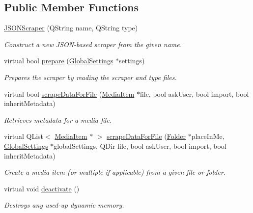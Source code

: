 \subsection*{Public Member Functions}
\begin{DoxyCompactItemize}
\item 
\hyperlink{class_a_w_e_1_1_j_s_o_n_scraper_ac6fe5d6f084e3b9ff5fdd1e5cd883351}{J\-S\-O\-N\-Scraper} (Q\-String name, Q\-String type)
\begin{DoxyCompactList}\small\item\em Construct a new J\-S\-O\-N-\/based scraper from the given name. \end{DoxyCompactList}\item 
virtual bool \hyperlink{class_a_w_e_1_1_j_s_o_n_scraper_a1b12fde072ef979911fcca4191c3c2a7}{prepare} (\hyperlink{class_a_w_e_1_1_global_settings}{Global\-Settings} $\ast$settings)
\begin{DoxyCompactList}\small\item\em Prepares the scraper by reading the scraper and type files. \end{DoxyCompactList}\item 
virtual bool \hyperlink{class_a_w_e_1_1_j_s_o_n_scraper_a883ec1b6814b4f192a28f32c8f47dd39}{scrape\-Data\-For\-File} (\hyperlink{class_a_w_e_1_1_media_item}{Media\-Item} $\ast$file, bool ask\-User, bool import, bool inherit\-Metadata)
\begin{DoxyCompactList}\small\item\em Retrieves metadata for a media file. \end{DoxyCompactList}\item 
virtual Q\-List$<$ \hyperlink{class_a_w_e_1_1_media_item}{Media\-Item} $\ast$ $>$ \hyperlink{class_a_w_e_1_1_j_s_o_n_scraper_a1ccab4a9c36f8420222a75de1282eb2f}{scrape\-Data\-For\-File} (\hyperlink{class_a_w_e_1_1_folder}{Folder} $\ast$place\-In\-Me, \hyperlink{class_a_w_e_1_1_global_settings}{Global\-Settings} $\ast$global\-Settings, Q\-Dir file, bool ask\-User, bool import, bool inherit\-Metadata)
\begin{DoxyCompactList}\small\item\em Create a media item (or multiple if applicable) from a given file or folder. \end{DoxyCompactList}\item 
virtual void \hyperlink{class_a_w_e_1_1_j_s_o_n_scraper_a0d1a05a4c7273ff1063518592d68501a}{deactivate} ()
\begin{DoxyCompactList}\small\item\em Destroys any used-\/up dynamic memory. \end{DoxyCompactList}\item 

\end{DoxyCompactItemize}
